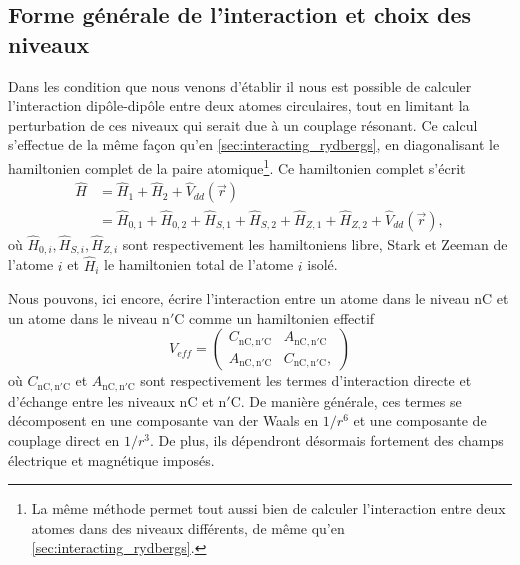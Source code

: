 \subsection{Forme générale de l'interaction et choix des niveaux}
\noindent Dans les condition que nous venons d'établir il nous est possible de calculer l'interaction dipôle-dipôle entre deux atomes circulaires, tout en limitant la perturbation de ces niveaux qui serait due à un couplage résonant.
Ce calcul s'effectue de la même façon qu'en \ref{sec:interacting_rydbergs}, en diagonalisant le hamiltonien complet de la paire atomique\footnote{
La même méthode permet tout aussi bien de calculer l'interaction entre deux atomes dans des niveaux différents, de même qu'en \ref{sec:interacting_rydbergs}.
}.
Ce hamiltonien complet s'écrit
\begin{equation}
\label{eq:hamilt_Vdd_ZeeStark}
\begin{aligned}
\hat{H} &= \hat{H}_1 + \hat{H}_2 + \hat{V}_{dd}(\vec{r}) \\
 &= \hat{H}_{0,1} + \hat{H}_{0,2} + \hat{H}_{S,1} + \hat{H}_{S,2} + \hat{H}_{Z,1} + \hat{H}_{Z,2} + \hat{V}_{dd}(\vec{r}),
\end{aligned}
\end{equation}
où $\hat{H}_{0,i},\hat{H}_{S,i},\hat{H}_{Z,i}$ sont respectivement les hamiltoniens libre, Stark et Zeeman de l'atome $i$ et $\hat{H}_i$ le hamiltonien total de l'atome $i$ isolé.

Nous pouvons, ici encore, écrire l'interaction entre un atome dans le niveau $\mathrm{nC}$ et un atome dans le niveau $\mathrm{n'C}$ comme un hamiltonien effectif
\begin{equation}
V_{eff} = \left(\begin{array}{cc}
C_{\mathrm{nC},\mathrm{n'C}} & A_{\mathrm{nC},\mathrm{n'C}} \\
A_{\mathrm{nC},\mathrm{n'C}} & C_{\mathrm{nC},\mathrm{n'C}},
\end{array} \right)
\end{equation}
où $C_{\mathrm{nC},\mathrm{n'C}}$ et $A_{\mathrm{nC},\mathrm{n'C}}$ sont respectivement les termes d'interaction directe et d'échange entre les niveaux $\mathrm{nC}$ et $\mathrm{n'C}$.
De manière générale, ces termes se décomposent en une composante \og van der Waals \fg{} en $1/r^6$ et une composante de couplage direct en $1/r^3$.
De plus, ils dépendront désormais fortement des champs électrique et magnétique imposés.



